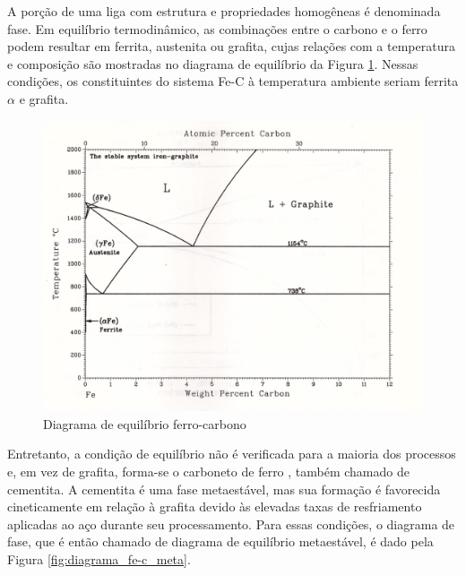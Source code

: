 \documentclass[brazil,tf,epusp]{usp}  %
\begin{document}
A porção de uma liga com estrutura e propriedades homogêneas é denominada fase. Em equilíbrio termodinâmico, as combinações entre o carbono e o ferro podem resultar em ferrita, austenita ou grafita, cujas relações com a temperatura e composição são mostradas no diagrama de equilíbrio da Figura \ref{fig:diagrama_fe-c}. Nessas condições, os constituintes do sistema Fe-C à temperatura ambiente seriam ferrita $\alpha$ e grafita.

\begin{figure}[ht!]
  \includegraphics[width=.8\textwidth,angle=180]{img/Fe-C.jpg}
  \caption{Diagrama de equilíbrio ferro-carbono \cite{Massalski1996v1}}
  \label{fig:diagrama_fe-c}
\end{figure}

Entretanto, a condição de equilíbrio não é verificada para a maioria dos processos e, em vez de grafita, forma-se o carboneto de ferro , também chamado de cementita. A cementita é uma fase metaestável, mas sua formação é favorecida cineticamente em relação à grafita devido às elevadas taxas de resfriamento aplicadas ao aço durante seu processamento.
Para essas condições, o diagrama de fase, que é então chamado de diagrama de equilíbrio metaestável, é dado pela Figura \ref{fig:diagrama_fe-c_meta}.
\end{document}
